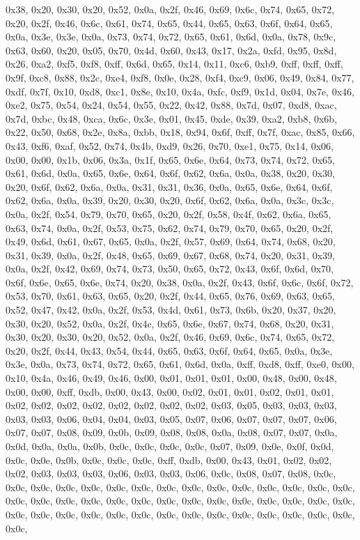 \documentclass[
]{book}
\begin{document}
0x38, 0x20, 0x30, 0x20, 0x52, 0x0a, 0x2f, 0x46, 0x69, 0x6c, 0x74, 0x65, 0x72, 0x20, 0x2f, 0x46, 0x6c, 0x61, 0x74, 0x65, 0x44, 0x65, 0x63, 0x6f, 0x64, 0x65, 0x0a, 0x3e, 0x3e, 0x0a, 0x73, 0x74, 0x72, 0x65, 0x61, 0x6d, 0x0a, 0x78, 0x9c, 0x63, 0x60, 0x20, 0x05, 0x70, 0x4d, 0x60, 0x43, 0x17, 0x2a, 0xfd, 0x95, 0x8d, 0x26, 0xa2, 0xf5, 0xf8, 0xff, 0x6d, 0x65, 0x14, 0x11, 0xc6, 0xb9, 0xff, 0xff, 0xff, 0x9f, 0xc8, 0x88, 0x2c, 0xe4, 0xf8, 0x0e, 0x28, 0xf4, 0xc9, 0x06, 0x49, 0x84, 0x77, 0xdf, 0x7f, 0x10, 0xd8,
0xc1, 0x8e, 0x10, 0x4a, 0xfc, 0xf9, 0x1d, 0x04, 0x7e, 0x46, 0xe2, 0x75, 0x54, 0x24, 0x54, 0x55, 0x22, 0x42, 0x88, 0x7d, 0x07, 0xd8, 0xac, 0x7d, 0xbc, 0x48, 0xca, 0x6c, 0x3e, 0x01, 0x45, 0xde, 0x39, 0xa2, 0xb8, 0x6b, 0x22, 0x50, 0x68, 0x2e, 0x8a, 0xbb, 0x18, 0x94, 0x6f, 0xff, 0x7f, 0xac, 0x85, 0x66, 0x43, 0xf6, 0xaf, 0x52, 0x74, 0x4b, 0xd9, 0x26, 0x70, 0xe1, 0x75, 0x14, 0x06, 0x00, 0x00, 0x1b, 0x06, 0x3a, 0x1f, 0x65, 0x6e, 0x64, 0x73, 0x74, 0x72, 0x65, 0x61, 0x6d, 0x0a, 0x65, 0x6e, 0x64, 0x6f, 0x62,
0x6a, 0x0a, 0x38, 0x20, 0x30, 0x20, 0x6f, 0x62, 0x6a, 0x0a, 0x31, 0x31, 0x36, 0x0a, 0x65, 0x6e, 0x64, 0x6f, 0x62, 0x6a, 0x0a, 0x39, 0x20, 0x30, 0x20, 0x6f, 0x62, 0x6a, 0x0a, 0x3c, 0x3c, 0x0a, 0x2f, 0x54, 0x79, 0x70, 0x65, 0x20, 0x2f, 0x58, 0x4f, 0x62, 0x6a, 0x65, 0x63, 0x74, 0x0a, 0x2f, 0x53, 0x75, 0x62, 0x74, 0x79, 0x70, 0x65, 0x20, 0x2f, 0x49, 0x6d, 0x61, 0x67, 0x65, 0x0a, 0x2f, 0x57, 0x69, 0x64, 0x74, 0x68, 0x20, 0x31, 0x39, 0x0a, 0x2f, 0x48, 0x65, 0x69, 0x67, 0x68, 0x74, 0x20, 0x31, 0x39, 0x0a,
0x2f, 0x42, 0x69, 0x74, 0x73, 0x50, 0x65, 0x72, 0x43, 0x6f, 0x6d, 0x70, 0x6f, 0x6e, 0x65, 0x6e, 0x74, 0x20, 0x38, 0x0a, 0x2f, 0x43, 0x6f, 0x6c, 0x6f, 0x72, 0x53, 0x70, 0x61, 0x63, 0x65, 0x20, 0x2f, 0x44, 0x65, 0x76, 0x69, 0x63, 0x65, 0x52, 0x47, 0x42, 0x0a, 0x2f, 0x53, 0x4d, 0x61, 0x73, 0x6b, 0x20, 0x37, 0x20, 0x30, 0x20, 0x52, 0x0a, 0x2f, 0x4c, 0x65, 0x6e, 0x67, 0x74, 0x68, 0x20, 0x31, 0x30, 0x20, 0x30, 0x20, 0x52, 0x0a, 0x2f, 0x46, 0x69, 0x6c, 0x74, 0x65, 0x72, 0x20, 0x2f, 0x44, 0x43, 0x54, 0x44,
0x65, 0x63, 0x6f, 0x64, 0x65, 0x0a, 0x3e, 0x3e, 0x0a, 0x73, 0x74, 0x72, 0x65, 0x61, 0x6d, 0x0a, 0xff, 0xd8, 0xff, 0xe0, 0x00, 0x10, 0x4a, 0x46, 0x49, 0x46, 0x00, 0x01, 0x01, 0x01, 0x00, 0x48, 0x00, 0x48, 0x00, 0x00, 0xff, 0xdb, 0x00, 0x43, 0x00, 0x02, 0x01, 0x01, 0x02, 0x01, 0x01, 0x02, 0x02, 0x02, 0x02, 0x02, 0x02, 0x02, 0x02, 0x03, 0x05, 0x03, 0x03, 0x03, 0x03, 0x03, 0x06, 0x04, 0x04, 0x03, 0x05, 0x07, 0x06, 0x07, 0x07, 0x07, 0x06, 0x07, 0x07, 0x08, 0x09, 0x0b, 0x09, 0x08, 0x08, 0x0a, 0x08, 0x07,
0x07, 0x0a, 0x0d, 0x0a, 0x0a, 0x0b, 0x0c, 0x0c, 0x0c, 0x0c, 0x07, 0x09, 0x0e, 0x0f, 0x0d, 0x0c, 0x0e, 0x0b, 0x0c, 0x0c, 0x0c, 0xff, 0xdb, 0x00, 0x43, 0x01, 0x02, 0x02, 0x02, 0x03, 0x03, 0x03, 0x06, 0x03, 0x03, 0x06, 0x0c, 0x08, 0x07, 0x08, 0x0c, 0x0c, 0x0c, 0x0c, 0x0c, 0x0c, 0x0c, 0x0c, 0x0c, 0x0c, 0x0c, 0x0c, 0x0c, 0x0c, 0x0c, 0x0c, 0x0c, 0x0c, 0x0c, 0x0c, 0x0c, 0x0c, 0x0c, 0x0c, 0x0c, 0x0c, 0x0c, 0x0c, 0x0c, 0x0c, 0x0c, 0x0c, 0x0c, 0x0c, 0x0c, 0x0c, 0x0c, 0x0c, 0x0c, 0x0c, 0x0c, 0x0c, 0x0c, 0x0c,
\end{document}

